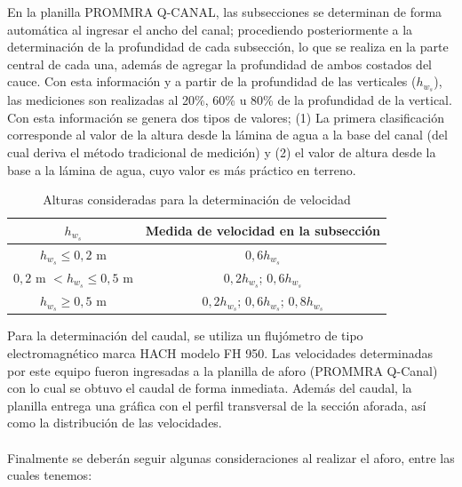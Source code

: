 \documentclass[]{article}
\begin{document}
En la planilla PROMMRA Q-CANAL, las subsecciones se determinan de forma automática al ingresar el ancho del canal; procediendo posteriormente a la determinación de la profundidad de cada subsección, lo que se realiza en la parte central de cada una, además de agregar la profundidad de ambos costados del cauce. Con esta información y a partir de la profundidad de las verticales (\(h_{w_s}\)), las mediciones son realizadas al 20\%, 60\% u 80\% de la profundidad de la vertical. Con esta información se genera dos tipos de valores; (1) La primera clasificación corresponde al valor de la altura desde la lámina de agua a la base del canal (del cual deriva el método tradicional de medición) y (2) el valor de altura desde la base a la lámina de agua, cuyo valor es más práctico en terreno.

\begin{table}[H]
 \caption{Alturas consideradas para la determinación de velocidad}
 \centering
 \begin{tabu} {cc}
 \toprule
 $h_{w_s}$ & Medida de velocidad en la subsección\\
 \midrule 
    $h_{w_s} \leq 0,2$ m & $0,6h_{w_s}$ \\ 
    $0,2$ m $< h_{w_s} \leq 0,5$ m  & $0,2h_{w_s}$; $0,6h_{w_s}$\\ 
    $h_{w_s} \geq 0,5$ m & $0,2h_{w_s}$; $0,6h_{w_s}$; $0,8h_{w_s}$\\
    \hline 
 \end{tabu}
\end{table}

Para la determinación del caudal, se utiliza un flujómetro de tipo electromagnético marca HACH modelo FH 950. Las velocidades determinadas por este equipo fueron ingresadas a la planilla de aforo (PROMMRA Q-Canal) con lo cual se obtuvo el caudal de forma inmediata. Además del caudal, la planilla entrega una gráfica con el perfil transversal de la sección aforada, así como la distribución de las velocidades.\\
\\
Finalmente se deberán seguir algunas consideraciones al realizar el aforo, entre las cuales tenemos:
\end{document}
